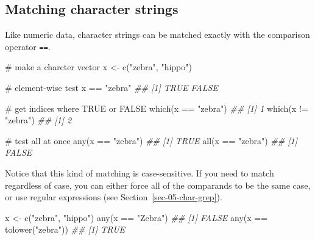 \documentclass[
  13,
  letterpaper,
]{report}
\newenvironment{Shaded}{\begin{snugshade}}{\end{snugshade}}
\newcommand{\CommentTok}[1]{\textcolor[rgb]{0.37,0.37,0.37}{#1}}
\newcommand{\DocumentationTok}[1]{\textcolor[rgb]{0.37,0.37,0.37}{\textit{#1}}}
\newcommand{\FunctionTok}[1]{\textcolor[rgb]{0.28,0.35,0.67}{#1}}
\newcommand{\NormalTok}[1]{\textcolor[rgb]{0.00,0.23,0.31}{#1}}
\newcommand{\OtherTok}[1]{\textcolor[rgb]{0.00,0.23,0.31}{#1}}
\newcommand{\SpecialCharTok}[1]{\textcolor[rgb]{0.37,0.37,0.37}{#1}}
\newcommand{\StringTok}[1]{\textcolor[rgb]{0.13,0.47,0.30}{#1}}
\begin{document}
\subsection{Matching character strings}\label{sec-05-char-match}

Like numeric data, character strings can be matched exactly with the
comparison operator \texttt{==}.

\begin{Shaded}
\begin{Highlighting}[]
\CommentTok{\# make a charcter vector}
\NormalTok{x }\OtherTok{\textless{}{-}} \FunctionTok{c}\NormalTok{(}\StringTok{"zebra"}\NormalTok{, }\StringTok{"hippo"}\NormalTok{)}

\CommentTok{\# element{-}wise test}
\NormalTok{x }\SpecialCharTok{==} \StringTok{"zebra"}
\DocumentationTok{\#\# [1]  TRUE FALSE}

\CommentTok{\# get indices where TRUE or FALSE}
\FunctionTok{which}\NormalTok{(x }\SpecialCharTok{==} \StringTok{"zebra"}\NormalTok{)}
\DocumentationTok{\#\# [1] 1}
\FunctionTok{which}\NormalTok{(x }\SpecialCharTok{!=} \StringTok{"zebra"}\NormalTok{)}
\DocumentationTok{\#\# [1] 2}

\CommentTok{\# test all at once}
\FunctionTok{any}\NormalTok{(x }\SpecialCharTok{==} \StringTok{"zebra"}\NormalTok{)}
\DocumentationTok{\#\# [1] TRUE}
\FunctionTok{all}\NormalTok{(x }\SpecialCharTok{==} \StringTok{"zebra"}\NormalTok{)}
\DocumentationTok{\#\# [1] FALSE}
\end{Highlighting}
\end{Shaded}

Notice that this kind of matching is case-sensitive. If you need to
match regardless of case, you can either force all of the comparands to
be the same case, or use regular expressions (see
Section~\ref{sec-05-char-grep}).

\begin{Shaded}
\begin{Highlighting}[]

\NormalTok{x }\OtherTok{\textless{}{-}} \FunctionTok{c}\NormalTok{(}\StringTok{"zebra"}\NormalTok{, }\StringTok{"hippo"}\NormalTok{)}
\FunctionTok{any}\NormalTok{(x }\SpecialCharTok{==} \StringTok{"Zebra"}\NormalTok{)}
\DocumentationTok{\#\# [1] FALSE}
\FunctionTok{any}\NormalTok{(x }\SpecialCharTok{==} \FunctionTok{tolower}\NormalTok{(}\StringTok{"zebra"}\NormalTok{))}
\DocumentationTok{\#\# [1] TRUE}
\end{Highlighting}
\end{Shaded}
\end{document}
